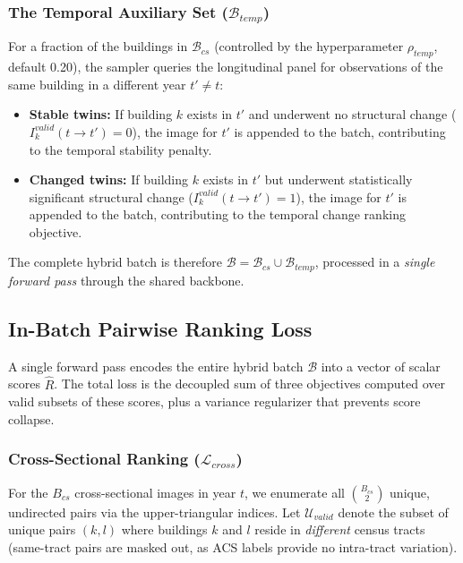 \documentclass{article}
\begin{document}
\subsubsection{The Temporal Auxiliary Set ($\mathcal{B}_{temp}$)}
For a fraction of the buildings in $\mathcal{B}_{cs}$ (controlled by the hyperparameter $\rho_{temp}$, default 0.20), the sampler queries the longitudinal panel for observations of the same building in a different year $t' \neq t$:
\begin{itemize}
    \item \textbf{Stable twins:} If building $k$ exists in $t'$ and underwent no structural change ($I_{k}^{valid}(t \to t') = 0$), the image for $t'$ is appended to the batch, contributing to the temporal stability penalty.
    \item \textbf{Changed twins:} If building $k$ exists in $t'$ but underwent statistically significant structural change ($I_{k}^{valid}(t \to t') = 1$), the image for $t'$ is appended to the batch, contributing to the temporal change ranking objective.
\end{itemize}

\noindent The complete hybrid batch is therefore $\mathcal{B} = \mathcal{B}_{cs} \cup \mathcal{B}_{temp}$, processed in a \textit{single forward pass} through the shared backbone.

\subsection{In-Batch Pairwise Ranking Loss}

A single forward pass encodes the entire hybrid batch $\mathcal{B}$ into a vector of scalar scores $\hat{R}$. The total loss is the decoupled sum of three objectives computed over valid subsets of these scores, plus a variance regularizer that prevents score collapse.

\subsubsection{Cross-Sectional Ranking ($\mathcal{L}_{cross}$)}

For the $B_{cs}$ cross-sectional images in year $t$, we enumerate all $\binom{B_{cs}}{2}$ unique, undirected pairs via the upper-triangular indices. Let $\mathcal{U}_{valid}$ denote the subset of unique pairs $(k, l)$ where buildings $k$ and $l$ reside in \textit{different} census tracts (same-tract pairs are masked out, as ACS labels provide no intra-tract variation).
\end{document}
